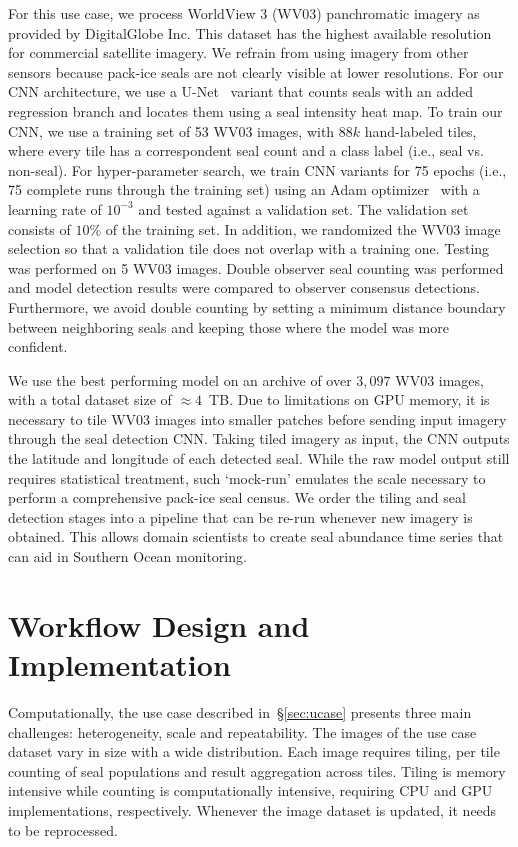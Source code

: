 For this use case, we process WorldView 3 (WV03) panchromatic imagery as provided by DigitalGlobe Inc.
This dataset has the highest available resolution for commercial satellite imagery.
We refrain from using imagery from other sensors because pack-ice seals are not clearly visible at lower resolutions.
For our CNN architecture, we use a U-Net~\cite{ronneberger2015u} variant that counts seals with an added regression branch and locates them using a seal intensity heat map.
To train our CNN, we use a training set of 53 WV03 images, with $88k$ hand-labeled tiles, where every tile has a correspondent seal count and a class label (i.e., seal vs. non-seal).
For hyper-parameter search, we train CNN variants for 75 epochs (i.e., 75 complete runs through the training set) using an Adam optimizer~\cite{kingma2014adam} with a learning rate of $10^{-3}$ and tested against a validation set.
The validation set consists of $10\%$ of the training set.
In addition, we randomized the WV03 image selection so that a validation tile does not overlap with a training one.
Testing was performed on 5 WV03 images.
Double observer seal counting was performed and model detection results were compared to observer consensus detections.
Furthermore, we avoid double counting by setting a minimum distance boundary between neighboring seals and keeping those where the model was more confident.

We use the best performing model on an archive of over $3,097$ WV03 images, with a total dataset size of $\approx4$~TB.
Due to limitations on GPU memory, it is necessary to tile WV03 images into smaller patches before sending input imagery through the seal detection CNN.
Taking tiled imagery as input, the CNN outputs the latitude and longitude of each detected seal.
While the raw model output still requires statistical treatment, such `mock-run' emulates the scale necessary to perform a comprehensive pack-ice seal census.
We order the tiling and seal detection stages into a pipeline that can be re-run whenever new imagery is obtained.
This allows domain scientists to create seal abundance time series that can aid in Southern Ocean monitoring.

\section{Workflow Design and Implementation}\label{sec:design}
Computationally, the use case described in~\S\ref{sec:ucase} presents three main challenges: heterogeneity, scale and repeatability.
The images of the use case dataset vary in size with a wide distribution.
Each image requires tiling, per tile counting of seal populations and result aggregation across tiles.
Tiling is memory intensive while counting is computationally intensive, requiring CPU and GPU implementations, respectively.
Whenever the image dataset is updated, it needs to be reprocessed.

